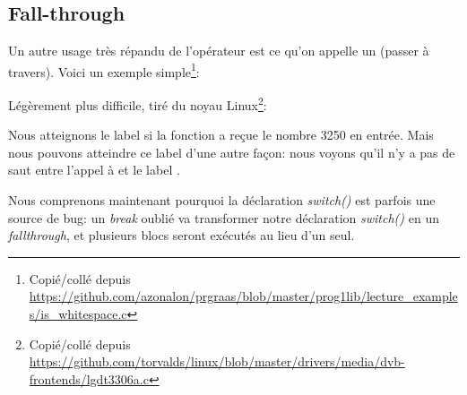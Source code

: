 ﻿\subsection{Fall-through}

Un autre usage très répandu de l'opérateur  est ce qu'on appelle
un  (passer à travers).
Voici un exemple simple\footnote{Copié/collé depuis \url{https://github.com/azonalon/prgraas/blob/master/prog1lib/lecture_examples/is_whitespace.c}}:



Légèrement plus difficile, tiré du noyau Linux\footnote{Copié/collé depuis \url{https://github.com/torvalds/linux/blob/master/drivers/media/dvb-frontends/lgdt3306a.c}}:





Nous atteignons le label  si la fonction a reçue le nombre 3250 en entrée.
Mais nous pouvons atteindre ce label d'une autre façon:
nous voyons qu'il n'y a pas de saut entre l'appel à \printf et le label .

Nous comprenons maintenant pourquoi la déclaration \emph{switch()} est parfois une
source de bug:
un \emph{break} oublié va transformer notre déclaration \emph{switch()} en un \emph{fallthrough},
et plusieurs blocs seront exécutés au lieu d'un seul.

